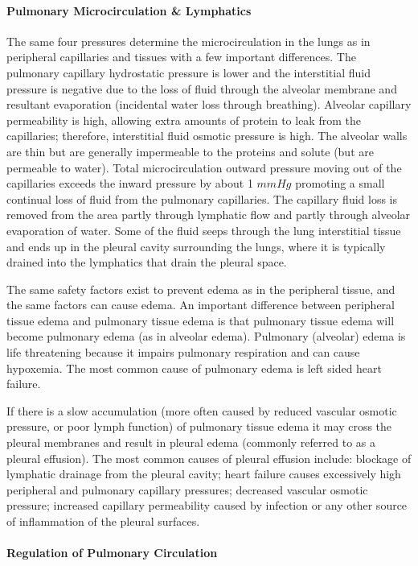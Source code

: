 \paragraph{Pulmonary Microcirculation \& Lymphatics}

The same four pressures determine the microcirculation in the lungs as in peripheral capillaries and tissues with a few important differences. The pulmonary capillary hydrostatic pressure is lower and the interstitial fluid pressure is negative due to the loss of fluid through the alveolar membrane and resultant evaporation (incidental water loss through breathing). Alveolar capillary permeability is high, allowing extra amounts of protein to leak from the capillaries; therefore, interstitial fluid osmotic pressure is high. The alveolar walls are thin but are generally impermeable to the proteins and solute (but are permeable to water). Total microcirculation outward pressure moving out of the capillaries exceeds the inward pressure by about 1 $mmHg$ promoting a small continual loss of fluid from the pulmonary capillaries. The capillary fluid loss is removed from the area partly through lymphatic flow and partly through alveolar evaporation of water. Some of the fluid seeps through the lung interstitial tissue and ends up in the pleural cavity surrounding the lungs, where it is typically drained into the lymphatics that drain the pleural space.

The same safety factors exist to prevent edema as in the peripheral tissue, and the same factors can cause edema. An important difference between peripheral tissue edema and pulmonary tissue edema is that pulmonary tissue edema will become pulmonary edema (as in alveolar edema). Pulmonary (alveolar) edema is life threatening because it impairs pulmonary respiration and can cause hypoxemia. The most common cause of pulmonary edema is left sided heart failure. 

If there is a slow accumulation (more often caused by reduced vascular osmotic pressure, or poor lymph function) of pulmonary tissue edema it may cross the pleural membranes and result in pleural edema (commonly referred to as a pleural effusion). The most common causes of pleural effusion include: blockage of lymphatic drainage from the pleural cavity; heart failure causes excessively high peripheral and pulmonary capillary pressures;  decreased vascular osmotic pressure; increased capillary permeability caused by infection or any other source of inflammation of the pleural surfaces.

\paragraph{Regulation of Pulmonary Circulation}

